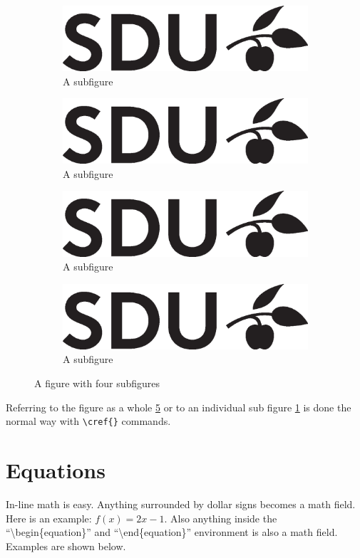 \begin{figure}[H]
\centering
\begin{subfigure}{.49\textwidth}
  \centering
  \includegraphics[width=.3\linewidth]{Pictures/Logos/sdu_black_cmyk.eps}
  \caption{A subfigure}
  \label{fig:foursub1}
\end{subfigure}%
\begin{subfigure}{.49\textwidth}
  \centering
  \includegraphics[width=.3\linewidth]{Pictures/Logos/sdu_black_cmyk.eps}
  \caption{A subfigure}
  \label{fig:foursub2}
\end{subfigure}
\begin{subfigure}{.49\textwidth}
  \centering
  \includegraphics[width=.3\linewidth]{Pictures/Logos/sdu_black_cmyk.eps}
  \caption{A subfigure}
  \label{fig:foursub3}
\end{subfigure}
\begin{subfigure}{.49\textwidth}
  \centering
  \includegraphics[width=.3\linewidth]{Pictures/Logos/sdu_black_cmyk.eps}
  \caption{A subfigure}
  \label{fig:foursub4}
\end{subfigure}
\caption{A figure with four subfigures}
\label{fig:foursubfigures}
\end{figure}

Referring to the figure as a whole \cref{fig:foursubfigures} or to an individual sub figure \cref{fig:foursub1} is done the normal way with \texttt{\textbackslash cref\{\}} commands.


\section{Equations}
In-line math is easy. Anything surrounded by dollar signs becomes a math field. Here is an example: $f(x)=2x-1$. Also anything inside the ``\textbackslash begin\{equation\}'' and  ``\textbackslash end\{equation\}'' environment is also a math field. Examples are shown below. 

